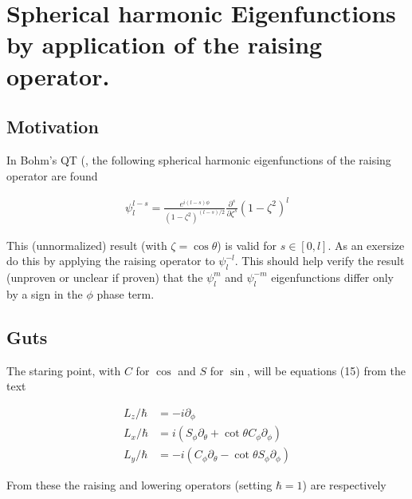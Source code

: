 

\chapter{Spherical harmonic Eigenfunctions by application of the raising operator.}
\label{chap:sphericalHarmonicRaising}
{}
\date{Aug 18, 2009}

\beginArtNoToc

\section{Motivation}

In Bohm's QT (\cite{bohm1989qt}, the following spherical harmonic eigenfunctions of the raising operator are found

\begin{align}\label{eqn:foo0}
\psi_l^{l-s} = \frac{e^{i(l-s)\phi}}{(1-\zeta^2)^{(l-s)/2}} \frac{\partial^s}{\partial \zeta^s} (1-\zeta^2)^l
\end{align}

This (unnormalized) result (with $\zeta = \cos\theta$) is valid for $s \in [0,l]$.  As an exersize do this by applying the raising operator to $\psi_l^{-l}$.  This should help verify the result (unproven or unclear if proven) that the $\psi_l^m$ and $\psi_l^{-m}$ eigenfunctions differ only by a sign in the $\phi$ phase term.

\section{Guts}

The staring point, with $C$ for $\cos$ and $S$ for $\sin$, will be equations (15) from the text

\begin{align*}
L_z/\hbar &= -i \partial_\phi \\
L_x/\hbar &= i (S_\phi \partial_\theta + \cot\theta C_\phi \partial_\phi) \\
L_y/\hbar &= -i (C_\phi \partial_\theta - \cot\theta S_\phi \partial_\phi)
\end{align*}

From these the raising and lowering operators (setting $\hbar=1$) are respectively

